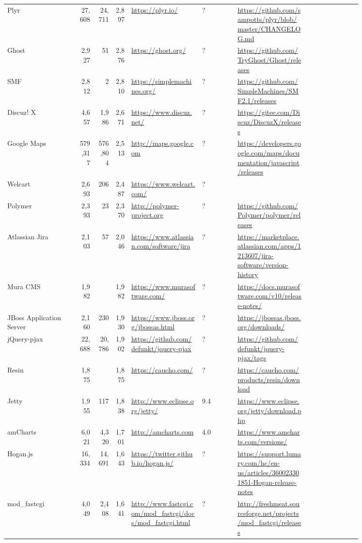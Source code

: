 \begin{longtable}{|p{0.2\linewidth}|r|r|r|p{0.2\linewidth}|p{0.1\linewidth}|p{0.2\linewidth}|p{0.15\linewidth}|}
	Plyr &27,608 &24,711 &2,897 &\url{https://plyr.io/} &? &\url{https://github.com/sampotts/plyr/blob/master/CHANGELOG.md} \\
	Ghost &2,927 &51 &2,876 &\url{https://ghost.org/} &? &\url{https://github.com/TryGhost/Ghost/releases} \\
	SMF &2,812 &2 &2,810 &\url{https://simplemachines.org/} &? &\url{https://github.com/SimpleMachines/SMF2.1/releases} \\
	Discuz! X &4,657 &1,986 &2,671 &\url{https://www.discuz.net/} &? &\url{https://gitee.com/Discuz/DiscuzX/releases} \\
	Google Maps &579,317 &576,804 &2,513 &\url{http://maps.google.com} &? &\url{https://developers.google.com/maps/documentation/javascript/releases} \\
	Welcart &2,693 &206 &2,487 &\url{https://www.welcart.com/} &? & \\
	Polymer &2,393 &23 &2,370 &\url{http://polymer-project.org} &? &\url{https://github.com/Polymer/polymer/releases} \\
	Atlassian Jira &2,103 &57 &2,046 &\url{https://www.atlassian.com/software/jira} &? &\url{https://marketplace.atlassian.com/apps/1213607/jira-software/version-history} \\
	Mura CMS &1,982 & &1,982 &\url{https://www.murasoftware.com/} &? &\url{https://docs.murasoftware.com/v10/release-notes/} \\
	JBoss Application Server &2,160 &230 &1,930 &\url{https://www.jboss.org/jbossas.html} &? &\url{https://jbossas.jboss.org/downloads/} \\
	jQuery-pjax &22,688 &20,786 &1,902 &\url{https://github.com/defunkt/jquery-pjax} &? &\url{https://github.com/defunkt/jquery-pjax/tags} \\
	Resin &1,875 & &1,875 &\url{https://caucho.com/} &? &\url{https://caucho.com/products/resin/download} \\
	Jetty &1,955 &117 &1,838 &\url{http://www.eclipse.org/jetty/} &9.4 &\url{https://www.eclipse.org/jetty/download.php} \\
	amCharts &6,021 &4,320 &1,701 &\url{http://amcharts.com} &4.0 &\url{https://www.amcharts.com/versions/} \\
	Hogan.js &16,334 &14,691 &1,643 &\url{https://twitter.github.io/hogan.js/} &? &\url{https://support.lumary.com/hc/en-us/articles/360023301851-Hogan-release-notes} \\
	mod\_fastcgi &4,049 &2,408 &1,641 &\url{http://www.fastcgi.com/mod\_fastcgi/docs/mod\_fastcgi.html} &? &\url{http://freshmeat.sourceforge.net/projects/mod\_fastcgi/releases} \\

\end{longtable}
